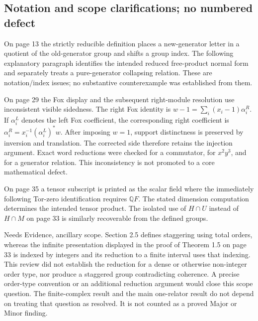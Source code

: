 \documentclass[10pt]{article}
\begin{document}
\subsection*{Notation and scope clarifications; no numbered defect}
On page 13 the strictly reducible definition places a new-generator letter in a quotient of the old-generator group and shifts a group index. The following explanatory paragraph identifies the intended reduced free-product normal form and separately treats a pure-generator collapsing relation. These are notation/index issues; no substantive counterexample was established from them.\par
On page 29 the Fox display and the subsequent right-module resolution use inconsistent visible sidedness. The right Fox identity is \(w-1=\sum_i(x_i-1)\alpha_i^R\). If \(\alpha_i^L\) denotes the left Fox coefficient, the corresponding right coefficient is \(\alpha_i^R=x_i^{-1}(\alpha_i^L)^*w\). After imposing \(w=1\), support distinctness is preserved by inversion and translation. The corrected side therefore retains the injection argument. Exact word reductions were checked for a commutator, for \(x^2y^3\), and for a generator relation. This inconsistency is not promoted to a core mathematical defect.\par
On page 35 a tensor subscript is printed as the scalar field where the immediately following Tor-zero identification requires \(\mathbb QF\). The stated dimension computation determines the intended tensor product. The isolated use of \(H\cap U\) instead of \(H\cap M\) on page 33 is similarly recoverable from the defined groups.\par
Needs Evidence, ancillary scope. Section 2.5 defines staggering using total orders, whereas the infinite presentation displayed in the proof of Theorem 1.5 on page 33 is indexed by integers and its reduction to a finite interval uses that indexing. This review did not establish the reduction for a dense or otherwise non-integer order type, nor produce a staggered group contradicting coherence. A precise order-type convention or an additional reduction argument would close this scope question. The finite-complex result and the main one-relator result do not depend on treating that question as resolved. It is not counted as a proved Major or Minor finding.\par
\end{document}
